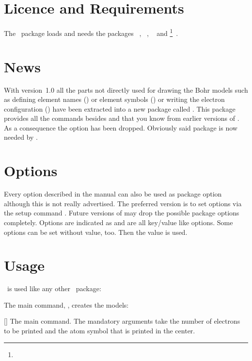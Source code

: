 \documentclass[load-preamble+]{cnltx-doc}
\begin{document}
\section{Licence and Requirements}
\license

The \BOHR\ package loads and needs the packages
~\cite{pkg:pgf},
~\cite{pkg:pgfopts},
~\cite{pkg:elements} and
\footnote{}~\cite{bnd:cnltx}.

\section{News}
With version~1.0 all the parts not directly used for drawing the Bohr models
such as defining element names () or element symbols
() or writing the electron configuration ()
have been extracted into a new package called .  This package
provides all the commands besides  and  that you know
from earlier versions of \BOHR.  As a consequence the option
 has been dropped.  Obviously said package is now needed by
\BOHR.

\section{Options}
Every option described in the manual can also be used as package option
although this is not really advertised.  The preferred version is to set
options via the setup command .  Future versions of  may
drop the possible package options completely.  Options are indicated as
 and are all key/value like options.  Some options can be set
without value, too.  Then the  value is used.

\section{Usage}
\BOHR\ is used like any other \LaTeXe\ package:
\begin{sourcecode}
  \usepackage{bohr}
\end{sourcecode}

The main command, , creates the models:
\begin{commands}
 []
   The main command.  The mandatory arguments take the number of electrons to
   be printed and the atom symbol that is printed in the center.
\end{commands}
\end{document}

